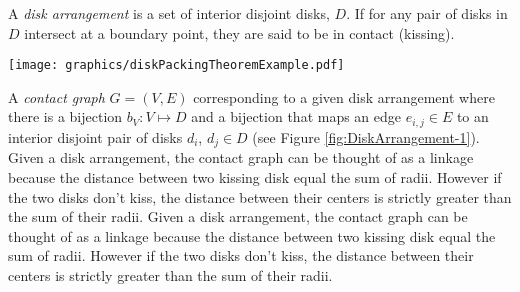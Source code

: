 \documentclass[10pt]{CSUNthesis}
\theoremstyle{plain}%
\theoremstyle{definition}
\theoremstyle{remark}
\begin{document}


 A \textit{disk arrangement} is a set of interior disjoint disks, $D$.  
 If for any pair of disks in $D$ intersect at a boundary point, they are said to be in contact (kissing).

\begin{minipage}{\linewidth}
\texttt{[image: graphics/diskPackingTheoremExample.pdf]}
\label{fig:DiskArrangement-1}
\end{minipage}

A \textit{contact graph} $G=(V,E)$ corresponding to a given disk arrangement where there is a bijection $b_V: V \mapsto D$ and a bijection that maps an edge $e_{i,j} \in E$ to an interior disjoint pair of disks $d_i$, $d_j \in D$ (see Figure \ref{fig:DiskArrangement-1}).
Given a disk arrangement, the contact graph can be thought of as a linkage because the distance between two kissing disk equal the sum of radii.  
However if the two disks don't kiss, the distance between their centers is strictly greater than the sum of their radii.
Given a disk arrangement, the contact graph can be thought of as a linkage because the distance between two kissing disk equal the sum of radii.  
However if the two disks don't kiss, the distance between their centers is strictly greater than the sum of their radii.
\end{document}
